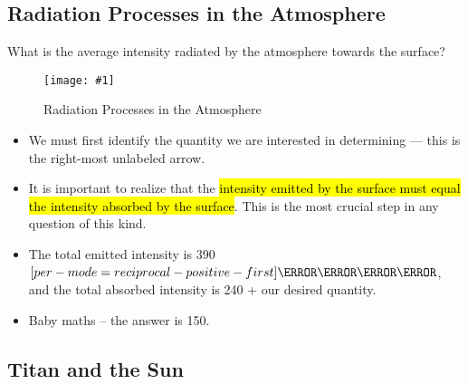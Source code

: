 \documentclass[a4paper,12pt]{article}
\let\oldsi\si
\renewcommand{\si}[1]{\oldsi[per-mode=reciprocal-positive-first]{#1}}
\newcommand{\img}[4]{\begin{center}
  \begin{figure}[H]
    \centering
    \texttt{[image: \#1]}
    \caption{#3}
    \label{fig:#4}
  \end{figure}
\end{center}}
\begin{document}
\pagebreak

\subsection{Radiation Processes in the Atmosphere}

What is the average intensity radiated by the atmosphere towards the surface?
\img{ex/2.png}{0.7}{Radiation Processes in the Atmosphere}{rad}
\begin{itemize}
  \item We must first identify the quantity we are interested in determining --- this is the right-most unlabeled arrow.
  \item It is important to realize that the \hl{intensity emitted by the surface must equal the intensity absorbed by the surface}. This is the most crucial step in any question of this kind.
  \item The total emitted intensity is 390 $\si{\W\per\m\squared}$, and the total absorbed intensity is 240 + our desired quantity.
  \item Baby maths -- the answer is 150.
\end{itemize}

\pagebreak

\subsection{Titan and the Sun}
\end{document}
